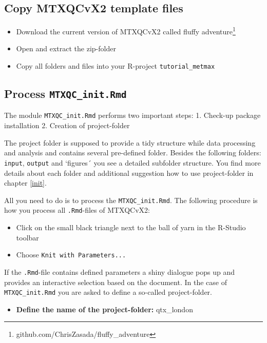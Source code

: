 \documentclass[]{book}
\providecommand{\tightlist}{%
  \setlength{\itemsep}{0pt}\setlength{\parskip}{0pt}}
\let\rmarkdownfootnote\footnote%
\def\footnote{\protect\rmarkdownfootnote}
\theoremstyle{definition}
\theoremstyle{definition}
\theoremstyle{definition}
\theoremstyle{remark}
\begin{document}
\subsection{Copy MTXQCvX2 template
files}\label{copy-mtxqcvx2-template-files-1}

\begin{itemize}
\tightlist
\item
  Download the current version of MTXQCvX2 called fluffy
  adventure\footnote{github.com/ChrisZasada/fluffy\_adventure}
\item
  Open and extract the zip-folder
\item
  Copy all folders and files into your R-project
  \texttt{tutorial\_metmax}
\end{itemize}

\subsection{\texorpdfstring{Process
\texttt{MTXQC\_init.Rmd}}{Process MTXQC\_init.Rmd}}\label{process-mtxqc_init.rmd-1}

The module \texttt{MTXQC\_init.Rmd} performs two important steps: 1.
Check-up package installation 2. Creation of project-folder

The project folder is supposed to provide a tidy structure while data
processing and analysis and contains several pre-defined folder. Besides
the following folders: \texttt{input}, \texttt{output} and `figures´ you
see a detailed subfolder structure. You find more details about each
folder and additional suggestion how to use project-folder in chapter
\ref{init}.

All you need to do is to process the \texttt{MTXQC\_init.Rmd}. The
following procedure is how you process all \texttt{.Rmd}-files of
MTXQCvX2:

\begin{itemize}
\tightlist
\item
  Click on the small black triangle next to the ball of yarn in the
  R-Studio toolbar
\item
  Choose \texttt{Knit\ with\ Parameters...}
\end{itemize}

If the \texttt{.Rmd}-file contains defined parameters a shiny dialogue
pops up and provides an interactive selection based on the document. In
the case of \texttt{MTXQC\_init.Rmd} you are asked to define a so-called
project-folder.

\begin{itemize}
\tightlist
\item
  \textbf{Define the name of the project-folder:} qtx\_london
\end{itemize}
\end{document}
